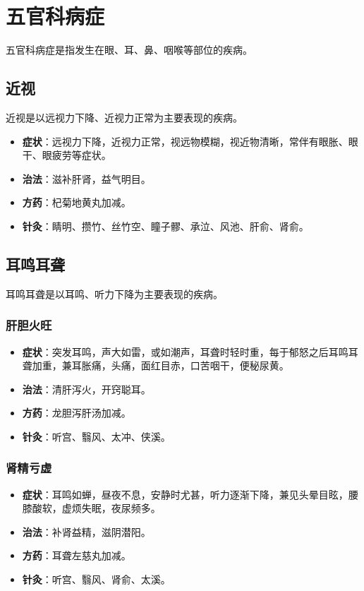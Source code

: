 \documentclass[12pt,UTF8]{ctexbook}
\begin{document}
\section{五官科病症}

五官科病症是指发生在眼、耳、鼻、咽喉等部位的疾病。

\subsection{近视}

近视是以远视力下降、近视力正常为主要表现的疾病。

\begin{itemize}
\item \textbf{症状}：远视力下降，近视力正常，视远物模糊，视近物清晰，常伴有眼胀、眼干、眼疲劳等症状。
\item \textbf{治法}：滋补肝肾，益气明目。
\item \textbf{方药}：杞菊地黄丸加减。
\item \textbf{针灸}：睛明、攒竹、丝竹空、瞳子髎、承泣、风池、肝俞、肾俞。
\end{itemize}

\subsection{耳鸣耳聋}

耳鸣耳聋是以耳鸣、听力下降为主要表现的疾病。

\subsubsection{肝胆火旺}

\begin{itemize}
\item \textbf{症状}：突发耳鸣，声大如雷，或如潮声，耳聋时轻时重，每于郁怒之后耳鸣耳聋加重，兼耳胀痛，头痛，面红目赤，口苦咽干，便秘尿黄。
\item \textbf{治法}：清肝泻火，开窍聪耳。
\item \textbf{方药}：龙胆泻肝汤加减。
\item \textbf{针灸}：听宫、翳风、太冲、侠溪。
\end{itemize}

\subsubsection{肾精亏虚}

\begin{itemize}
\item \textbf{症状}：耳鸣如蝉，昼夜不息，安静时尤甚，听力逐渐下降，兼见头晕目眩，腰膝酸软，虚烦失眠，夜尿频多。
\item \textbf{治法}：补肾益精，滋阴潜阳。
\item \textbf{方药}：耳聋左慈丸加减。
\item \textbf{针灸}：听宫、翳风、肾俞、太溪。
\end{itemize}
\end{document}
